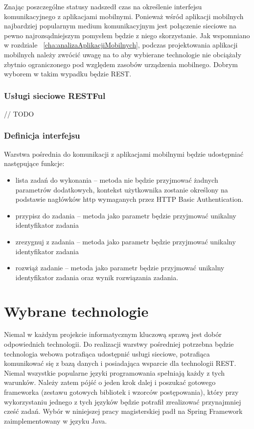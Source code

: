 Znając poszczególne statusy nadszedł czas na określenie interfejsu komunikacyjnego z aplikacjami mobilnymi. Ponieważ wśród aplikacji mobilnych najbardziej popularnym medium komunikacyjnym jest połączenie sieciowe na pewno najrozsądniejszym pomysłem będzie z niego skorzystanie. Jak wspomniano w rozdziale ~\ref{cha:analizaAplikacjiMobilnych}, podczas projektowania aplikacji mobilnych należy zwrócić uwagę na to aby wybierane technologie nie obciążały zbytnio ograniczonego pod względem zasobów urządzenia mobilnego. Dobrym wyborem w takim wypadku będzie REST. 

\subsubsection{Usługi sieciowe RESTFul}
// TODO

\subsubsection{Definicja interfejsu}

Warstwa pośrednia do komunikacji z aplikacjami mobilnymi będzie udostępniać następujące funkcje:

\begin{itemize}
\item lista zadań do wykonania -- metoda nie będzie przyjmować żadnych parametrów dodatkowych, kontekst użytkownika zostanie określony na podstawie nagłówków http wymaganych przez HTTP Basic Authentication. 
\item przypisz do zadania -- metoda jako parametr będzie przyjmować unikalny identyfikator zadania  
\item zrezygnuj z zadania -- metoda jako parametr będzie przyjmować unikalny identyfikator zadania  
\item rozwiąż zadanie -- metoda jako parametr będzie przyjmować unikalny identyfikator zadania  oraz wynik rozwiązania zadania. 
\end{itemize}


\section{Wybrane technologie}
\label{sec:technologies}

Niemal w każdym projekcie informatycznym kluczową sprawą jest dobór odpowiednich technologii. Do realizacji warstwy pośredniej potrzebna będzie technologia webowa potrafiąca udostępnić usługi sieciowe, potrafiąca komunikować się z bazą danych i posiadająca wsparcie dla technologii REST. Niemal wszystkie popularne języki programowania spełniają każdy z tych warunków. Należy zatem pójść o jeden krok dalej i poszukać gotowego frameworka (zestawu gotowych bibliotek i wzorców postępowania), który przy wykorzystaniu jednego z tych języków będzie potrafił zrealizować przynajmniej cześć zadań. Wybór w niniejszej pracy magisterskiej padł na Spring Framework zaimplementowany w języku Java. 

